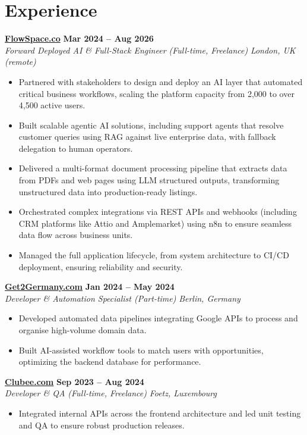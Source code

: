 \documentclass[a4paper,10pt]{article}
\newcommand{\role}[4]{%
 \textbf{#1} \hfill \textbf{#2}\\[1pt]%
 \textit{#3} \hfill \textit{#4}\\[2pt]%
}
\begin{document}
\section{Experience}

\role{\href{https://flowspace.co}{FlowSpace.co}}{Mar 2024 -- Aug 2026}{Forward Deployed AI \& Full-Stack Engineer (Full-time, Freelance)}{London, UK (remote)}
\begin{itemize}
 \item Partnered with stakeholders to design and deploy an AI layer that automated critical business workflows, scaling the platform capacity from 2,000 to over 4,500 active users.
 \item Built scalable agentic AI solutions, including support agents that resolve customer queries using RAG against live enterprise data, with fallback delegation to human operators.
 \item Delivered a multi-format document processing pipeline that extracts data from PDFs and web pages using LLM structured outputs, transforming unstructured data into production-ready listings.
 \item Orchestrated complex integrations via REST APIs and webhooks (including CRM platforms like Attio and Amplemarket) using n8n to ensure seamless data flow across business units.
 \item Managed the full application lifecycle, from system architecture to CI/CD deployment, ensuring reliability and security.
\end{itemize}

\role{\href{https://get2germany.com}{Get2Germany.com}}{Jan 2024 -- May 2024}{Developer \& Automation Specialist (Part-time)}{Berlin, Germany}
\begin{itemize}
 \item Developed automated data pipelines integrating Google APIs to process and organise high-volume domain data.
 \item Built AI-assisted workflow tools to match users with opportunities, optimizing the backend database for performance.
\end{itemize}

\role{\href{https://clubee.com}{Clubee.com}}{Sep 2023 -- Aug 2024}{Developer \& QA (Full-time, Freelance)}{Foetz, Luxembourg}
\begin{itemize}
 \item Integrated internal APIs across the frontend architecture and led unit testing and QA to ensure robust production releases.
\end{itemize}
\end{document}
